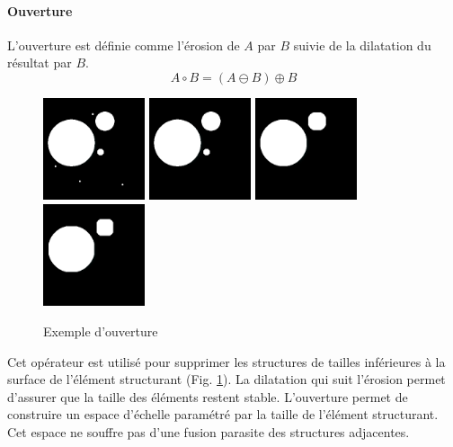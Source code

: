   \paragraph{Ouverture}
  L'ouverture est définie comme l'érosion de $A$ par $B$ suivie de la dilatation du résultat par $B$.
  \begin{equation}
   A \circ B = (A \ominus B) \oplus B
  \end{equation}
  \begin{figure}[h]
    \centering
    \includegraphics[height=3cm]{Images/morpho_init.png}
    \includegraphics[height=3cm]{Images/morpho_open_k5.png}
    \includegraphics[height=3cm]{Images/morpho_open_k21.png}
    \includegraphics[height=3cm]{Images/morpho_open_k31.png}
    \caption{Exemple d'ouverture}
    \label{fig:morpho_ouverture}
  \end{figure}
  Cet opérateur est utilisé pour supprimer les structures de tailles inférieures à la surface de l'élément structurant (Fig. \ref{fig:morpho_ouverture}). La dilatation qui suit l'érosion permet d'assurer que la taille des éléments restent stable. L'ouverture permet de construire un espace d'échelle paramétré par la taille de l'élément structurant. Cet espace ne souffre pas d'une fusion parasite des structures adjacentes.
  
